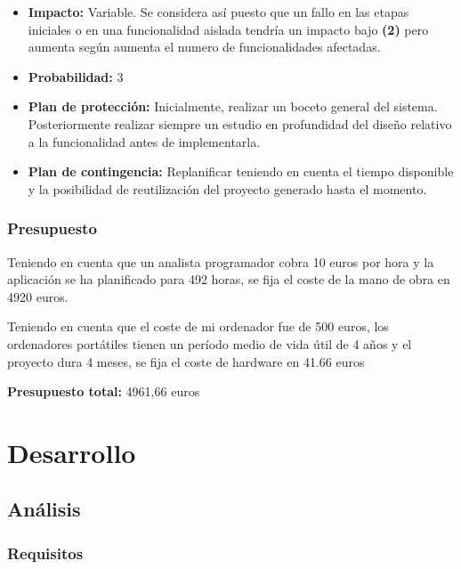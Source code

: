 \documentclass[openright,twoside,10pt]{book}
\providecommand{\tightlist}{%
  \setlength{\itemsep}{0pt}\setlength{\parskip}{0pt}}
\begin{document}
\begin{itemize}
      \begin{itemize}
      \tightlist
      \item
        \textbf{Impacto:} Variable. Se considera así puesto que un fallo en
        las etapas iniciales o en una funcionalidad aislada tendría un
        impacto bajo \textbf{(2)} pero aumenta según aumenta el numero de
        funcionalidades afectadas.
      \item
        \textbf{Probabilidad:} 3
      \item
        \textbf{Plan de protección:} Inicialmente, realizar un boceto
        general del sistema. Posteriormente realizar siempre un estudio en
        profundidad del diseño relativo a la funcionalidad antes de
        implementarla.
      \item
        \textbf{Plan de contingencia:} Replanificar teniendo en cuenta el
        tiempo disponible y la posibilidad de reutilización del proyecto
        generado hasta el momento.
      \end{itemize}
    \end{itemize}
    
    \subsection{Presupuesto}\label{presupuesto}
    
    Teniendo en cuenta que un analista programador cobra 10 euros por hora y
    la aplicación se ha planificado para 492 horas, se fija el coste de la
    mano de obra en 4920 euros.
    
    Teniendo en cuenta que el coste de mi ordenador fue de 500 euros, los
    ordenadores portátiles tienen un período medio de vida útil de 4 años y
    el proyecto dura 4 meses, se fija el coste de hardware en 41.66 euros
    
    \textbf{Presupuesto total:} 4961,66 euros
    
    \chapter{ Desarrollo }
    
    \section{Análisis}\label{anuxe1lisis}
    
    \subsection{Requisitos}\label{requisitos}
    
\end{document}
